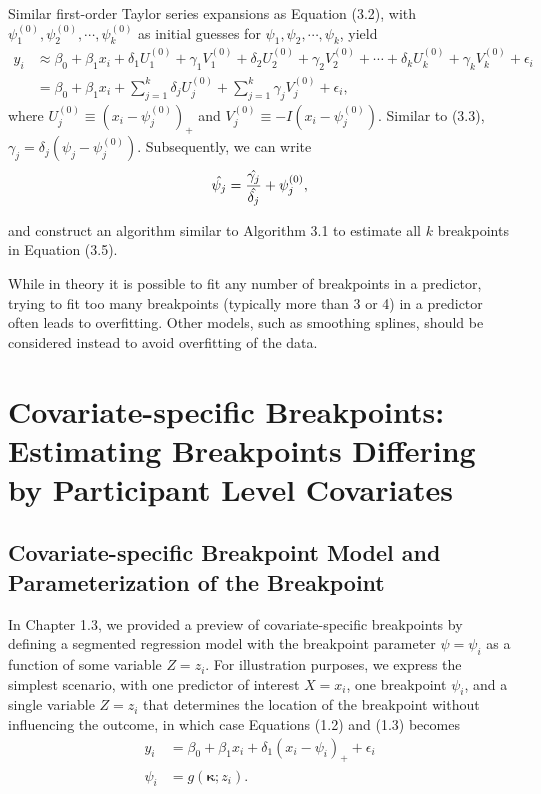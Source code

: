 \documentclass [12pt, proquest] {uwthesis}[2016/11/22]
\begin{document}
Similar first-order Taylor series expansions as Equation (3.2), with $\psi_1^{(0)}, \psi_2^{(0)}, \cdots, \psi_k^{(0)}$ as initial guesses for $\psi_1, \psi_2, \cdots, \psi_k$, yield
\begin{align}
    y_i &\approx \beta_0 + \beta_1 x_i + \delta_1 U_1^{(0)} + \gamma_1 V_1^{(0)} + \delta_2 U_2^{(0)} + \gamma_2 V_2^{(0)} + \cdots + \delta_k U_k^{(0)} + \gamma_k V_k^{(0)} + \epsilon_i \nonumber \\
    &= \beta_0 + \beta_1 x_i + \sum_{j=1}^k \delta_j U_j^{(0)} + \sum_{j=1}^k \gamma_j V_j^{(0)} + \epsilon_i,
\end{align}
where $U_j^{(0)} \equiv (x_i - \psi_j^{(0)})_+$ and $V_j^{(0)} \equiv -I(x_i - \psi_j^{(0)})$. Similar to (3.3), $\gamma_j = \delta_j (\psi_j - \psi_j^{(0)})$. Subsequently, we can write
\begin{align}
    \Hat{\psi_j} = \dfrac{\Hat{\gamma_j}}{\Hat{\delta_j}} + \psi_j^{(0)},
\end{align}

and construct an algorithm similar to Algorithm 3.1 to estimate all $k$ breakpoints in Equation (3.5).

While in theory it is possible to fit any number of breakpoints in a predictor, trying to fit too many breakpoints (typically more than 3 or 4) in a predictor often leads to overfitting. Other models, such as smoothing splines, should be considered instead to avoid overfitting of the data.
 
\section{Covariate-specific Breakpoints: Estimating Breakpoints Differing by Participant Level Covariates}

\subsection{Covariate-specific Breakpoint Model and Parameterization of the Breakpoint}
 
In Chapter 1.3, we provided a preview of covariate-specific breakpoints by defining a segmented regression model with the breakpoint parameter $\psi = \psi_i$ as a function of some variable $Z = z_i$. For illustration purposes, we express the simplest scenario, with one predictor of interest $X = x_i$, one breakpoint $\psi_i$, and a single variable $Z = z_i$ that determines the location of the breakpoint without influencing the outcome, in which case Equations (1.2) and (1.3) becomes
\begin{align}
    y_i &= \beta_0 + \beta_1 x_i + \delta_1 (x_i - \psi_i)_+ + \epsilon_i \\
    \psi_i &= g(\bm{\kappa}; z_i).
\end{align}
\end{document}

